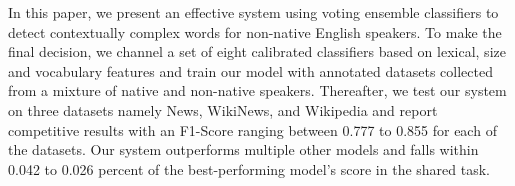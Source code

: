 In this paper, we present an effective system using voting ensemble classifiers to detect contextually complex words for non-native English speakers. To make the final decision, we channel a set of eight calibrated classifiers based on lexical, size and vocabulary features and train our model with annotated datasets collected from a mixture of native and non-native speakers. Thereafter, we test our system on three datasets namely News, WikiNews, and Wikipedia and report competitive results with an F1-Score ranging between 0.777 to 0.855 for each of the datasets. Our system outperforms multiple other models and falls within 0.042 to 0.026 percent of the best-performing model's score in the shared task.
